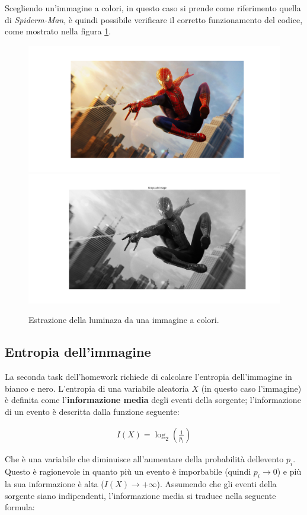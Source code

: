 \noindent Scegliendo un'immagine a colori, in questo caso si prende come riferimento quella di \textsl{Spiderm-Man}, è quindi possibile verificare il corretto funzionamento del codice, come mostrato nella figura \ref{fig:colored-grayscale}.

\begin{figure}[h]
    \centering
    \includegraphics[width = .7\textwidth]{hw-1/report/imgs/colored.png}
    \includegraphics[width = .7\textwidth]{hw-1/report/imgs/grayscale.png}
    \caption{Estrazione della luminaza da una immagine a colori.}
    \label{fig:colored-grayscale}
\end{figure}



\subsection{Entropia dell'immagine}\label{img-entropy}
La seconda task dell'homework richiede di calcolare l'entropia dell'immagine in bianco e nero. L'entropia di una variabile aleatoria $X$ (in questo caso l'immagine) è definita come l'\textbf{informazione media} degli eventi della sorgente; l'informazione di un evento è descritta dalla funzione seguente:

\begin{gather*}
    I(X) = \log_2\left( \frac{1}{p_i} \right)
\end{gather*}

\noindent Che è una variabile che diminuisce all'aumentare della probabilità dellevento $p_i$. Questo è ragionevole in quanto più un evento è imporbabile (quindi $p_i \to 0$) e più la sua informazione è alta ($I(X) \to +\infty$). Assumendo che gli eventi della sorgente siano indipendenti, l'informazione media si traduce nella seguente formula:

